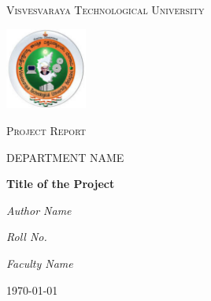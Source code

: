 \documentclass[12pt,a4paper]{article}
\begin{document}
	\begin{titlepage}        
    	\centering
   		 {\scshape\LARGE Visvesvaraya Technological University \par}
   		 \vspace{1cm}
   		 
   		 \includegraphics[width=0.2\textwidth]{VTU Logo.jpg}\par
   		 \vspace{1cm}
   		 
   		 {\scshape\LARGE Project Report\par}
   		 \vspace{1cm}
   		 
   		 {\scshape\large DEPARTMENT NAME \par}
   		 \vspace{1cm}
   		 
    	{\huge\bfseries Title of the Project\par}
    	\vspace{2cm}
    	
    	{\Large\itshape Author Name\par}
    	\vspace{1cm}
    	
    	{\Large\itshape Roll No. \par}
    	\vspace{1cm}
    	
    	{\Large\itshape Faculty Name \par}
    	\vfill
    	
    	{\large \today\par}
    	
	\end{titlepage}
\end{document}
